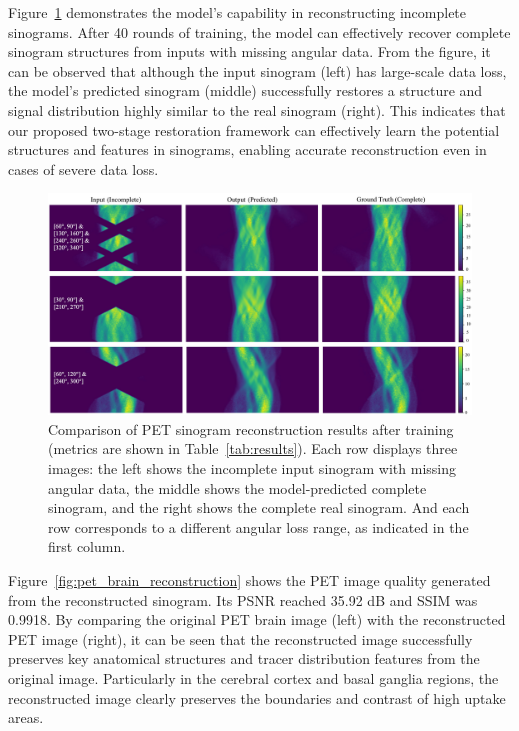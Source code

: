 \documentclass[aps,prb,preprint,groupedaddress,showkeys]{revtex4}
\begin{document}
Figure~\ref{fig:pet_reconstruction_results} demonstrates the model's capability in reconstructing incomplete sinograms. After 40 rounds of training, the model can effectively recover complete sinogram structures from inputs with missing angular data. From the figure, it can be observed that although the input sinogram (left) has large-scale data loss, the model's predicted sinogram (middle) successfully restores a structure and signal distribution highly similar to the real sinogram (right). This indicates that our proposed two-stage restoration framework can effectively learn the potential structures and features in sinograms, enabling accurate reconstruction even in cases of severe data loss.
\begin{figure}[ht]
    \centering
    \includegraphics[width=\textwidth]{Images/sinograms.pdf}
    \vspace{-1cm}
    \caption{Comparison of PET sinogram reconstruction results after training (metrics are shown in Table~\ref{tab:results}). Each row displays three images: the left shows the incomplete input sinogram with missing angular data, the middle shows the model-predicted complete sinogram, and the right shows the complete real sinogram. And each row corresponds to a different angular loss range, as indicated in the first column. }
    \label{fig:pet_reconstruction_results}
\end{figure}
Figure~\ref{fig:pet_brain_reconstruction} shows the PET image quality generated from the reconstructed sinogram. Its PSNR reached 35.92 dB and SSIM was 0.9918. By comparing the original PET brain image (left) with the reconstructed PET image (right), it can be seen that the reconstructed image successfully preserves key anatomical structures and tracer distribution features from the original image. Particularly in the cerebral cortex and basal ganglia regions, the reconstructed image clearly preserves the boundaries and contrast of high uptake areas. 
\end{document}
